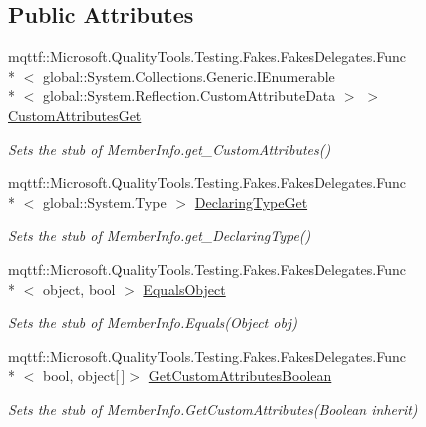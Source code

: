 \subsection*{Public Attributes}
\begin{DoxyCompactItemize}
\item 
mqttf\-::\-Microsoft.\-Quality\-Tools.\-Testing.\-Fakes.\-Fakes\-Delegates.\-Func\\*
$<$ global\-::\-System.\-Collections.\-Generic.\-I\-Enumerable\\*
$<$ global\-::\-System.\-Reflection.\-Custom\-Attribute\-Data $>$ $>$ \hyperlink{class_system_1_1_reflection_1_1_fakes_1_1_stub_member_info_a4a2f9c9347c09204b8ba64658477fbc8}{Custom\-Attributes\-Get}
\begin{DoxyCompactList}\small\item\em Sets the stub of Member\-Info.\-get\-\_\-\-Custom\-Attributes()\end{DoxyCompactList}\item 
mqttf\-::\-Microsoft.\-Quality\-Tools.\-Testing.\-Fakes.\-Fakes\-Delegates.\-Func\\*
$<$ global\-::\-System.\-Type $>$ \hyperlink{class_system_1_1_reflection_1_1_fakes_1_1_stub_member_info_a39b2013c283886c2291780a2a7b8d1be}{Declaring\-Type\-Get}
\begin{DoxyCompactList}\small\item\em Sets the stub of Member\-Info.\-get\-\_\-\-Declaring\-Type()\end{DoxyCompactList}\item 
mqttf\-::\-Microsoft.\-Quality\-Tools.\-Testing.\-Fakes.\-Fakes\-Delegates.\-Func\\*
$<$ object, bool $>$ \hyperlink{class_system_1_1_reflection_1_1_fakes_1_1_stub_member_info_ab9c8da97f05d69bcab280b5f7ae09d17}{Equals\-Object}
\begin{DoxyCompactList}\small\item\em Sets the stub of Member\-Info.\-Equals(\-Object obj)\end{DoxyCompactList}\item 
mqttf\-::\-Microsoft.\-Quality\-Tools.\-Testing.\-Fakes.\-Fakes\-Delegates.\-Func\\*
$<$ bool, object\mbox{[}$\,$\mbox{]}$>$ \hyperlink{class_system_1_1_reflection_1_1_fakes_1_1_stub_member_info_abf950b01e7e40cd9bbabcab9cfc2f299}{Get\-Custom\-Attributes\-Boolean}
\begin{DoxyCompactList}\small\item\em Sets the stub of Member\-Info.\-Get\-Custom\-Attributes(\-Boolean inherit)\end{DoxyCompactList}\item 

\end{DoxyCompactItemize}
